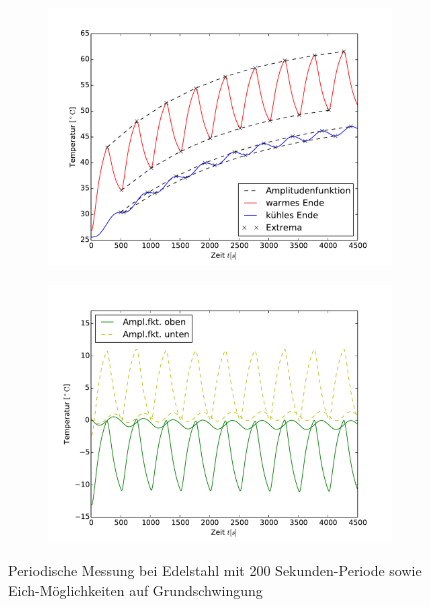 \begin{figure}[h!]
	\centering
	\begin{subfigure}{0.9\textwidth}
	\centering
	\includegraphics[width=\textwidth]{Bilder/M3_Edelstahl.pdf}
	\end{subfigure}
	\begin{subfigure}{0.9\textwidth}
	\centering
	\includegraphics[width=\textwidth]{Bilder/Normierungsauswahl/M3_Edelstahl_norm.pdf}
	\end{subfigure}
	\caption{Periodische Messung bei Edelstahl mit 200 Sekunden-Periode sowie Eich-Möglichkeiten auf Grundschwingung}
	\label{fig:M3Edelstahl}
\end{figure}
